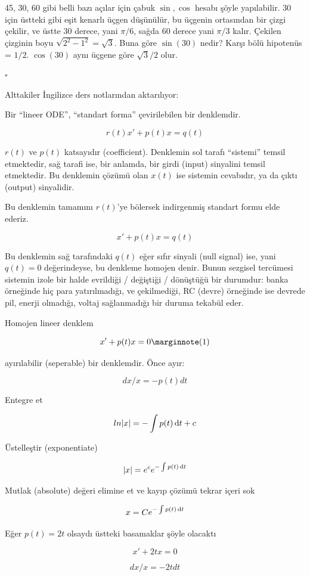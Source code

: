 \documentclass[12pt,fleqn]{article}\usepackage{../../common}
\begin{document}
45, 30, 60 gibi belli bazı açılar için çabuk $\sin,\cos$ hesabı şöyle
yapılabilir. 30 için üstteki gibi eşit kenarlı üçgen düşünülür, bu üçgenin
ortasından bir çizgi çekilir, ve üstte 30 derece, yani $\pi/6$, sağda 60
derece yani $\pi/3$ kalır. Çekilen çizginin boyu
$\sqrt{2^2 - 1^2} = \sqrt{3}$. Buna göre $\sin(30)$ nedir? Karşı bölü
hipotenüs = $1/2$. $\cos(30)$ aynı üçgene göre $\sqrt{3}/2$ olur.

$\square$

Alttakiler İngilizce ders notlarından aktarılıyor:

Bir ``lineer ODE'', ``standart forma'' çevirilebilen bir denklemdir.

$$ r(t)x' + p(t)x = q(t) $$

$r(t)$ ve $p(t)$ katsayıdır (coefficient). Denklemin sol tarafı ``sistemi''
temsil etmektedir, sağ tarafi ise, bir anlamda, bir girdi (input) sinyalini
temsil etmektedir. Bu denklemin çözümü olan $x(t)$ ise sistemin cevabıdır,
ya da çıktı (output) sinyalidir.

Bu denklemin tamamını $r(t)$'ye bölersek indirgenmiş standart formu elde
ederiz.

$$ x' + p(t)x = q(t) $$

Bu denklemin sağ tarafındaki $q(t)$ eğer sıfır sinyali (null signal) ise,
yani $q(t) = 0$ değerindeyse, bu denkleme homojen denir. Bunun sezgisel
tercümesi sistemin izole bir halde evrildiği / değiştiği / dönüştüğü bir
durumdur: banka örneğinde hiç para yatırılmadığı, ve çekilmediği, RC
(devre) örneğinde ise devrede pil, enerji olmadığı, voltaj sağlanmadığı bir
duruma tekabül eder.

Homojen lineer denklem

$$
x' + p(t) x = 0 
\mlabel{1}
$$

ayırılabilir (seperable) bir denklemdir. Önce ayır:

$$ dx/x = - p(t) dt $$

Entegre et

$$ ln|x| = - \int p(t) \,\mathrm{d} t + c $$

Üstelleştir (exponentiate)

$$ |x| = e^c e^{ - \int p(t) \,\mathrm{d} t } $$

Mutlak (absolute) değeri elimine et ve kayıp çözümü tekrar içeri sok

$$ x = C e^{- \int p(t) \,\mathrm{d} t} $$

Eğer $p(t) = 2t$ olsaydı üstteki basamaklar şöyle olacaktı

$$ x' + 2tx = 0 $$

$$ dx/x = - 2t dt $$
\end{document}

